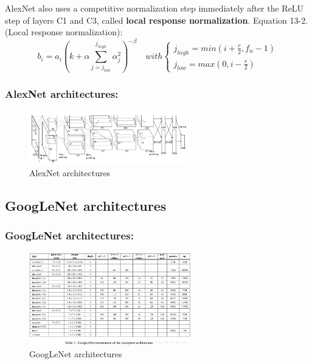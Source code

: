 \documentclass{beamer}
\begin{document}
    \begin{frame}
    AlexNet also uses a competitive normalization step immediately after the ReLU step of layers C1 and C3, called \textbf{local response normalization}. 
        Equation 13-2.(Local response normalization):
        \begin{equation}
             b_i=a_i\left(k+\alpha\sum_{j=j_{low}}^{j_{high}}\alpha_j^2\right)^{-\beta}\quad with 
             \left\{\begin{array}{lr}
                 j_{high}=min\left(i+\frac{r}{2},f_n-1\right)\\
                 j_{low}=max\left(0,i-\frac{r}{2}\right)
             \end{array}
            \right.
        \end{equation}
    \end{frame}  
      
    \begin{frame}
    \frametitle{AlexNet architectures: }
        \begin{figure}[H]
            \begin{center}
                \includegraphics[width=7cm]{FIGURE13-2.png}
            \end{center}
        \caption{AlexNet architectures}
        \end{figure}
    \end{frame}
\subsection{GoogLeNet architectures}
    \begin{frame}
    \frametitle{GoogLeNet architectures: }
         \begin{figure}[H]
            \begin{center}
                \includegraphics[width=7cm]{table13-3}
            \end{center}
        \caption{GoogLeNet architectures}
        \end{figure}
    \end{frame}
\end{document}
